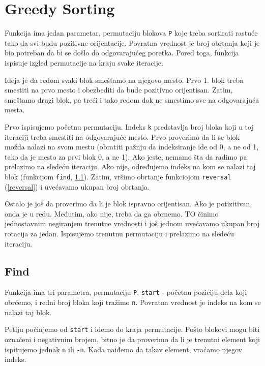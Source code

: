\section{Greedy Sorting}

Funkcija ima jedan parametar, permutaciju blokova \texttt{P} koje treba sortirati rastuće tako da svi budu pozitivne orijentacije. Povratna vrednost je broj obrtanja koji je bio potreban da bi se došlo do odgovarajućeg poretka. Pored toga, funkcija ispisuje izgled permutacije na kraju svake iteracije.

Ideja je da redom svaki blok smeštamo na njegovo mesto. Prvo 1. blok treba smestiti na prvo mesto i obezbediti da bude pozitivno orijentisan. Zatim, smeštamo drugi blok, pa treći i tako redom dok ne smestimo sve na odgovarajuća mesta.

Prvo ispisujemo početnu permutaciju. Indeks \texttt{k} predstavlja broj bloka koji u toj iteraciji treba smestiti na odgovarajuće mesto. Prvo proverimo da li se blok možda nalazi na svom mestu (obratiti pažnju da indeksiranje ide od 0, a ne od 1, tako da je mesto za prvi blok 0, a ne 1). Ako jeste, nemamo šta da radimo pa prelazimo na sledeću iteraciju. Ako nije, određujemo indeks na kom se nalazi taj blok (funkcijom \texttt{find}, \ref{find}). Zatim, vršimo obrtanje funkciojom \texttt{reversal} (\ref{reversal}) i uvećavamo ukupan broj obrtanja. 

Ostalo je još da proverimo da li je blok ispravno orijentisan. Ako je potizitivan, onda je u redu. Međutim, ako nije, treba da ga obrnemo. TO činimo jednostavnim negiranjem trenutne vrednosti i još jednom uvećavamo ukupan broj rotacija za jedan. Ispisujemo trenutnu permutaciju i prelazimo na sledeću iteraciju.




\subsection{Find}
\label{find}

Funkcija ima tri parametra, permutaciju \texttt{P},  \texttt{start} - početnu poziciju dela koji obrćemo, i redni broj bloka koji tražimo \texttt{n}. Povratna vrednost je indeks na kom se nalazi taj blok.

Petlju počinjemo od \texttt{start} i idemo do kraja permutacije. Pošto blokovi mogu biti označeni i negativnim brojem, bitno je da proverimo da li je trenutni element koji ispitujemo jednak \texttt{n} ili \texttt{-n}. Kada naiđemo da takav element, vraćamo njegov indeks.

